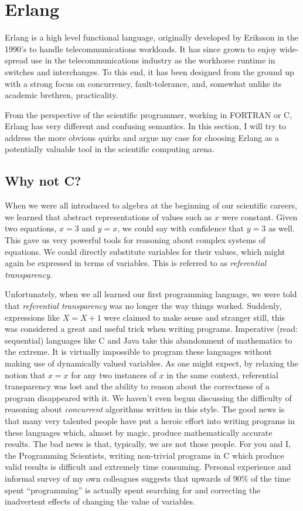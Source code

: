 \documentclass[twocolumn,a4paper,10pt]{article}
\begin{document}
\section{Erlang}

Erlang is a high level functional language, originally developed by Eriksson in
the 1990's to handle telecommunications workloads. It has since grown to enjoy
wide-spread use in the telecommunications industry as the workhorse runtime in
switches and interchanges. To this end, it has been designed from the ground up
with a strong focus on concurrency, fault-tolerance, and, somewhat unlike its
academic brethren, practicality.

From the perspective of the scientific programmer, working in FORTRAN or C,
Erlang has very different and confusing semantics. In this section, I will try
to address the more obvious quirks and argue my case for choosing Erlang as a
potentially valuable tool in the scientific computing arena.

\subsection{Why not C?}

When we were all introduced to algebra at the beginning of our scientific
careers, we learned that abstract representations of values such as $x$ were
constant. Given two equations, $x = 3$ and $y = x$, we could say with confidence
that $y = 3$ as well. This gave us very powerful tools for reasoning about
complex systems of equations. We could directly substitute variables for their
values, which might again be expressed in terms of variables. This is referred
to as \emph{referential transparency}.

Unfortunately, when we all learned our first programming language, we were told
that \emph{referential transparency} was no longer the way things worked.
Suddenly, expressions like $X = X + 1$ were claimed to make sense and stranger
still, this was considered a great and useful trick when writing programs.
Imperative (read: sequential) languages like C and Java take this abandonment of
mathematics to the extreme. It is virtually impossible to program these
languages without making use of dynamically valued variables. As one might
expect, by relaxing the notion that $x = x$ for any two instances of $x$ in the
same context, referential transparency was lost and the ability to reason about
the correctness of a program disappeared with it. We haven't even begun
discussing the difficulty of reasoning about \emph{concurrent} algorithms
written in this style. The good news is that many very talented people have put
a heroic effort into writing programs in these languages which, almost by magic,
produce mathematically accurate results. The bad news is that, typically, we are
not those people. For you and I, the Programming Scientists, writing non-trivial
programs in C which produce valid results is difficult and extremely time
consuming. Personal experience and informal survey of my own colleagues suggests
that upwards of 90\% of the time spent ``programming'' is actually spent
searching for and correcting the inadvertent effects of changing the value of
variables.
\end{document}
